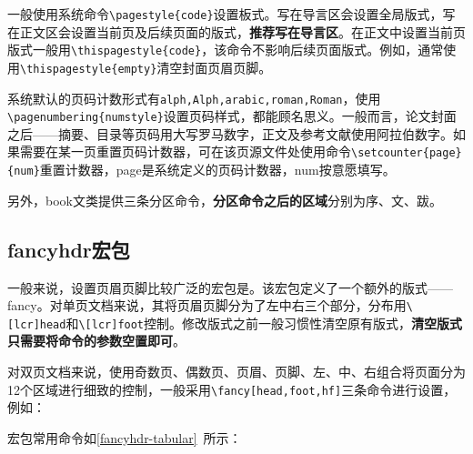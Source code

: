 一般使用系统命令\lstinline|\pagestyle{code}|设置板式。写在导言区会设置全局版式，写在正文区会设置当前页及后续页面的版式，\textbf{推荐写在导言区}。在正文中设置当前页版式一般用\lstinline|\thispagestyle{code}|，该命令不影响后续页面版式。例如，通常使用\lstinline|\thispagestyle{empty}|清空封面页眉页脚。

系统默认的页码计数形式有\lstinline|alph,Alph,arabic,roman,Roman|，使用\lstinline|\pagenumbering{numstyle}|设置页码样式，都能顾名思义。一般而言，论文封面之后——摘要、目录等页码用大写罗马数字，正文及参考文献使用阿拉伯数字。如果需要在某一页重置页码计数器，可在该页源文件处使用命令\lstinline|\setcounter{page}{num}|重置计数器，page是系统定义的页码计数器，num按意愿填写。

另外，book文类提供三条分区命令，\textbf{分区命令之后的区域}分别为序、文、跋。

\begin{latex}
\frontmatter
\mainmatter
\backmatter
\end{latex}

\subsection{fancyhdr宏包}
一般来说，设置页眉页脚比较广泛的宏包是。该宏包定义了一个额外的版式——fancy。对单页文档来说，其将页眉页脚分为了左中右三个部分，分布用\lstinline|\[lcr]head|和\lstinline|\[lcr]foot|控制。修改版式之前一般习惯性清空原有版式，\textbf{清空版式只需要将命令的参数空置即可}。

\begin{latex}
\usepackage{fancyhdr}
\pagestyle{fancy}
\fancyhf{}%
    \lhead{}
    \chead{}
    \cfoot{\thepage}
\end{latex}

对双页文档来说，使用奇数页、偶数页、页眉、页脚、左、中、右组合将页面分为12个区域进行细致的控制，一般采用\lstinline|\fancy[head,foot,hf]|三条命令进行设置，例如：

\begin{latex}
\fancyhead[LE,RO]{\slshape\rightmark}
\fancyhead[LO,RE]{\slshape\leftmark}
\fancyfoot[C]{\thepage}
\end{latex}

宏包常用命令如\autoref{fancyhdr-tabular}~所示：

